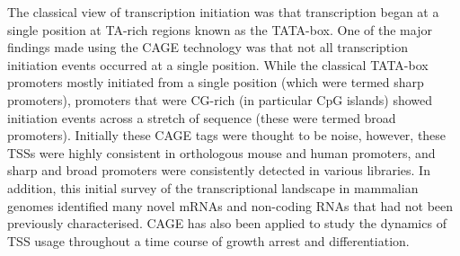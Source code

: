 The classical view of transcription initiation was that transcription began at a single position at TA-rich regions known as the TATA-box. One of the major findings made using the CAGE technology was that not all transcription initiation events occurred at a single position\cite{pmid16645617}. While the classical TATA-box promoters mostly initiated from a single position (which were termed sharp promoters), promoters that were CG-rich (in particular CpG islands) showed initiation events across a stretch of sequence (these were termed broad promoters). Initially these CAGE tags were thought to be noise, however, these TSSs were highly consistent in orthologous mouse and human promoters, and sharp and broad promoters were consistently detected in various libraries\cite{pmid16645617}. In addition, this initial survey of the transcriptional landscape in mammalian genomes identified many novel mRNAs and non-coding RNAs that had not been previously characterised\cite{pmid16141072}. CAGE has also been applied to study the dynamics of TSS usage throughout a time course of growth arrest and differentiation\cite{pmid19377474}.
